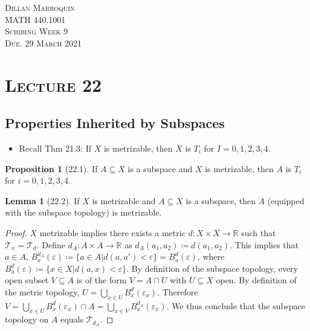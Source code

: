 \documentclass{article}
\newcommand{\R}{\ensuremath{\mathbb{R}}}
\newcommand{\coleq}{\ensuremath{\coloneqq}}
\newcommand{\func}[3]{\ensuremath{#1: #2 \to #3}}
\newcommand{\ball}[3]{\ensuremath{B_{#1}^{#2}(#3)}}
\newcommand{\tp}{\ensuremath{\mathscr{T}}}
\newcommand{\Union}{\bigcup}
\newcommand{\inter}{\cap}
\renewcommand{\Subset}{\subseteq}
\theoremstyle{definition}
\newtheorem*{prop}{Proposition}
\newtheorem*{lem}{Lemma}
\theoremstyle{remark}
\begin{document}
    \begin{center}
        \textsc{Dillan Marroquin\\MATH 440.1001\\Scribing Week 9\\Due. 29 March 2021\\}
    \end{center}
        
    \noindent\section*{\textbf{\textsc{Lecture 22}}}{
        \subsection*{Properties Inherited by Subspaces}{
        \begin{itemize}
            \item Recall Thm 21.3: If $X$ is metrizable, then $X$ is $T_i$ for $I=0,1,2,3,4$.
        \end{itemize}
        
        \begin{prop}[22.1]
            If $A \Subset X$ is a subspace and $X$ is metrizable, then $A$ is $T_i$ for $i=0,1,2,3,4$.
        \end{prop}
        
        \begin{lem}[22.2]
            If $X$ is metrizable and $A \Subset X$ is a subspace, then $A$ (equipped with the subspace topology) is metrizable.
        \end{lem}
        
        \begin{proof}
            $X$ metrizable implies there exists a metric $\func{d}{X\times X}{\R}$ such that $\tp_x=\tp_d$. Define $\func{d_A}{A\times A}{\R}$ as $d_A(a_1,a_2) \coleq d(a_1,a_2)$. This implies that $a \in A$, $\ball{a}{d_A}{\varepsilon} \coleq \{a\in A|d(a,a')<\varepsilon\}=\ball{a}{d}{\varepsilon}$, where $\ball{a}{d}{\varepsilon}\coleq \{x\in X|d(a,x)<\varepsilon\}$. By definition of the subspace topology, every open subset $V\Subset A$ is of the form $V=A\inter U$ with $U \Subset X$ open. By definition of the metric topology, $U=\Union_{x\in U}\ball{x}{d}{\varepsilon_x}$. Therefore $V=\Union_{x\in U}\ball{x}{d}{\varepsilon_x} \inter A=\Union_{x\in V} \ball{x}{d_A}{\varepsilon_x}$. We thus conclude that the subspace topology on $A$ equals $\tp_{d_A}$.
        \end{proof}
        
}}
\end{document}
